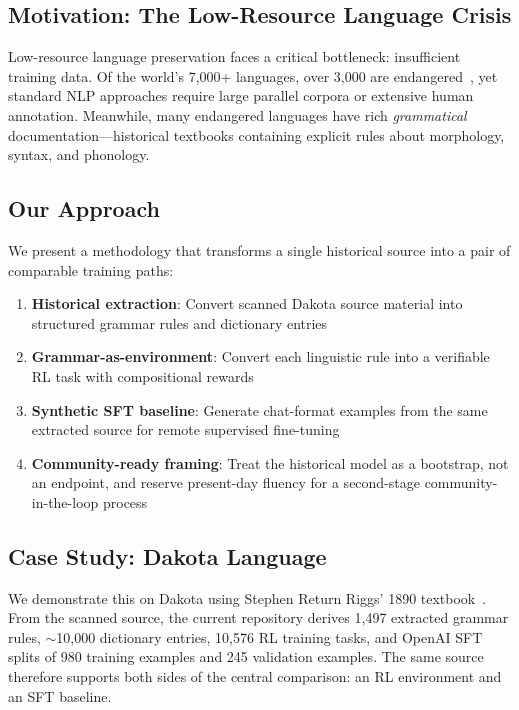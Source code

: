 \documentclass{article}
\begin{document}
\subsection{Motivation: The Low-Resource Language Crisis}

Low-resource language preservation faces a critical bottleneck: insufficient training data. Of the world's 7,000+ languages, over 3,000 are endangered~\cite{unesco2023atlas}, yet standard NLP approaches require large parallel corpora or extensive human annotation. Meanwhile, many endangered languages have rich \emph{grammatical} documentation---historical textbooks containing explicit rules about morphology, syntax, and phonology.

\subsection{Our Approach}

We present a methodology that transforms a single historical source into a pair of comparable training paths:

\begin{enumerate}
    \item \textbf{Historical extraction}: Convert scanned Dakota source material into structured grammar rules and dictionary entries
    \item \textbf{Grammar-as-environment}: Convert each linguistic rule into a verifiable RL task with compositional rewards
    \item \textbf{Synthetic SFT baseline}: Generate chat-format examples from the same extracted source for remote supervised fine-tuning
    \item \textbf{Community-ready framing}: Treat the historical model as a bootstrap, not an endpoint, and reserve present-day fluency for a second-stage community-in-the-loop process
\end{enumerate}

\subsection{Case Study: Dakota Language}

We demonstrate this on Dakota using Stephen Return Riggs' 1890 textbook~\cite{riggs1890dakota}. From the scanned source, the current repository derives 1,497 extracted grammar rules, $\sim$10,000 dictionary entries, 10,576 RL training tasks, and OpenAI SFT splits of 980 training examples and 245 validation examples. The same source therefore supports both sides of the central comparison: an RL environment and an SFT baseline.
\end{document}
